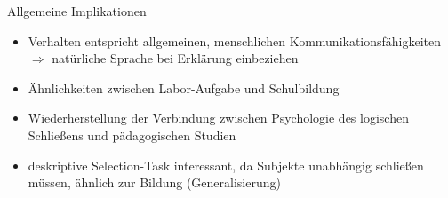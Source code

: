 \begin{frame}{Allgemeine Implikationen {\scriptsize \cite[S.~115]{stenningHumanReasoningCognitive2008}}}
    \begin{itemize}
        \item Verhalten entspricht allgemeinen, menschlichen Kommunikationsfähigkeiten \\
            $\Rightarrow$ \alert{natürliche Sprache} bei Erklärung einbeziehen
        
        \pause
        \item Ähnlichkeiten zwischen Labor-Aufgabe und \alert{Schulbildung}
        \item Wiederherstellung der Verbindung zwischen Psychologie des logischen Schließens und pädagogischen Studien
        
        \pause
        \item deskriptive Selection-Task interessant, da Subjekte unabhängig schließen müssen, ähnlich zur Bildung (Generalisierung)
    \end{itemize}
\end{frame}
